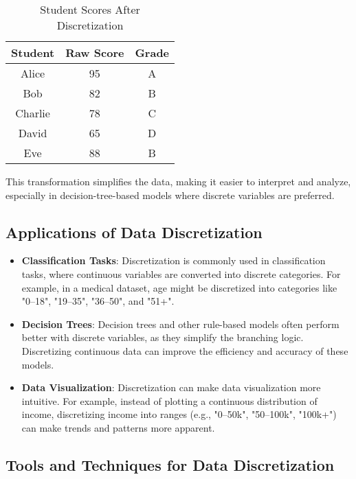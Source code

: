\documentclass[12pt]{article}
\begin{document}
\begin{table}[h!]
    \centering
    \begin{tabular}{|c|c|c|}
        \hline
        \textbf{Student} & \textbf{Raw Score} & \textbf{Grade} \\
        \hline
        Alice & 95 & A \\
        Bob & 82 & B \\
        Charlie & 78 & C \\
        David & 65 & D \\
        Eve & 88 & B \\
        \hline
    \end{tabular}
    \caption{Student Scores After Discretization}
    \label{tab:after_discretization}
\end{table}

This transformation simplifies the data, making it easier to interpret and analyze, especially in decision-tree-based models where discrete variables are preferred.

\subsection{Applications of Data Discretization}

\begin{itemize}
    \item \textbf{Classification Tasks}: Discretization is commonly used in classification tasks, where continuous variables are converted into discrete categories. For example, in a medical dataset, age might be discretized into categories like "0–18", "19–35", "36–50", and "51+".
    \item \textbf{Decision Trees}: Decision trees and other rule-based models often perform better with discrete variables, as they simplify the branching logic. Discretizing continuous data can improve the efficiency and accuracy of these models.
    \item \textbf{Data Visualization}: Discretization can make data visualization more intuitive. For example, instead of plotting a continuous distribution of income, discretizing income into ranges (e.g., "0–50k", "50–100k", "100k+") can make trends and patterns more apparent.
\end{itemize}

\subsection{Tools and Techniques for Data Discretization}
\end{document}
